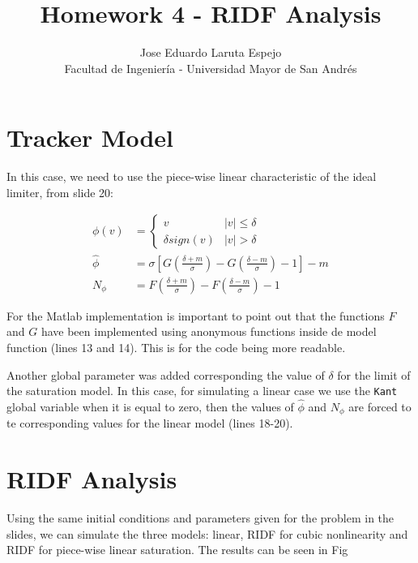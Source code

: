 \documentclass[12pt,letterpaper]{article}
\title{Homework 4 - RIDF Analysis}
\author{Jose Eduardo Laruta Espejo \\ Facultad de Ingeniería - Universidad Mayor de San Andrés}
\begin{document}
\maketitle

\section{Tracker Model}
In this case, we need to use the piece-wise linear characteristic of the ideal limiter, from slide 20:

\begin{align}
    \phi(v)     &= \left\{\begin{array}{ll}
                            v               &  |v| \leq \delta \\
                            \delta sign(v) &  |v| > \delta
                        \end{array}
                    \right. \\
    \hat{\phi}  &= \sigma \left[ G(\frac{\delta + m}{\sigma}) - G(\frac{\delta - m}{\sigma}) - 1\right] - m \\
    N_{\phi}    &= F(\frac{\delta + m}{\sigma}) - F(\frac{\delta - m}{\sigma}) - 1 
\end{align}

For the Matlab implementation is important to point out that the functions $F$ and $G$ 
have been implemented using anonymous functions inside de model function (lines 13 and 14). This is 
for the code being more readable.

Another global parameter was added corresponding the value of $\delta$ for the limit of 
the saturation model. In this case, for simulating a linear case we use the \texttt{Kant} global variable
when it is equal to zero, then the values of $\hat{\phi}$ and $N_{\phi}$ are forced 
to te corresponding values for the linear model (lines 18-20).



\section{RIDF Analysis}
Using the same initial conditions and parameters given for the problem in the slides, we 
can simulate the three models: linear, RIDF for cubic nonlinearity and RIDF for piece-wise 
linear saturation. The results can be seen in Fig  
\end{document}
